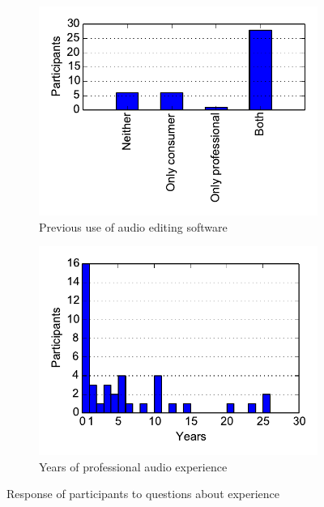 \begin{figure}[ht]
\centering
\begin{subfigure}{.5\textwidth}
  \centering
  \includegraphics[width=\textwidth]{figs/daw.pdf}
  \caption{Previous use of audio editing software}
  \label{fig:experiencedaw}
\end{subfigure}%
\begin{subfigure}{.5\textwidth}
  \centering
  \includegraphics[width=\linewidth]{figs/experience.pdf}
  \caption{Years of professional audio experience}
  \label{fig:experienceyears}
\end{subfigure}
\caption{Response of participants to questions about experience}
\label{fig:experience}
\end{figure}


